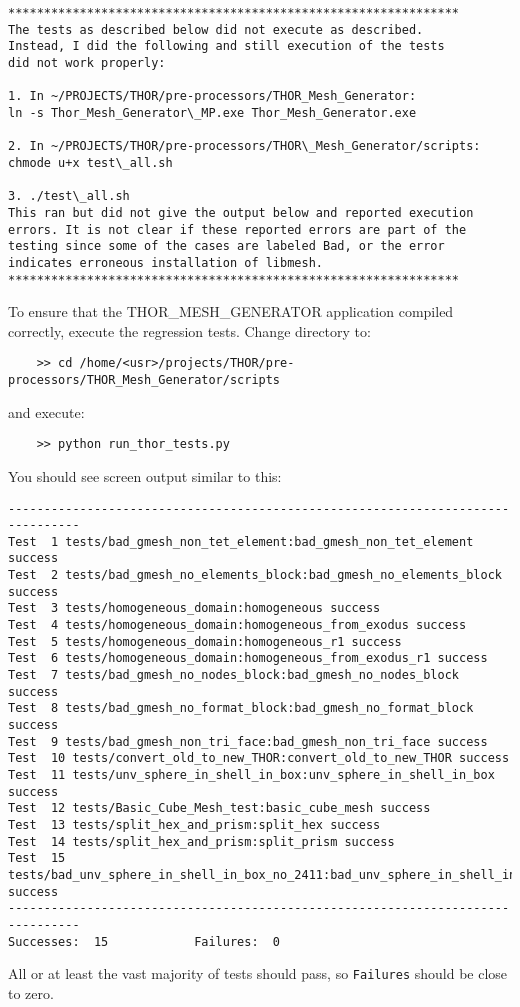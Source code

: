 \begin{verbatim}
***************************************************************
The tests as described below did not execute as described.
Instead, I did the following and still execution of the tests
did not work properly:

1. In ~/PROJECTS/THOR/pre-processors/THOR_Mesh_Generator:
ln -s Thor_Mesh_Generator\_MP.exe Thor_Mesh_Generator.exe

2. In ~/PROJECTS/THOR/pre-processors/THOR\_Mesh_Generator/scripts:
chmode u+x test\_all.sh

3. ./test\_all.sh
This ran but did not give the output below and reported execution
errors. It is not clear if these reported errors are part of the
testing since some of the cases are labeled Bad, or the error
indicates erroneous installation of libmesh.
***************************************************************
\end{verbatim}


To ensure that the THOR\_MESH\_GENERATOR application compiled correctly, execute the regression tests. Change directory to:
\begin{verbatim}
    >> cd /home/<usr>/projects/THOR/pre-processors/THOR_Mesh_Generator/scripts
\end{verbatim}
and execute:
\begin{verbatim}
    >> python run_thor_tests.py 
\end{verbatim}
You should see screen output similar to this:
\begin{verbatim}
--------------------------------------------------------------------------------
Test  1 tests/bad_gmesh_non_tet_element:bad_gmesh_non_tet_element success
Test  2 tests/bad_gmesh_no_elements_block:bad_gmesh_no_elements_block success
Test  3 tests/homogeneous_domain:homogeneous success
Test  4 tests/homogeneous_domain:homogeneous_from_exodus success
Test  5 tests/homogeneous_domain:homogeneous_r1 success
Test  6 tests/homogeneous_domain:homogeneous_from_exodus_r1 success
Test  7 tests/bad_gmesh_no_nodes_block:bad_gmesh_no_nodes_block success
Test  8 tests/bad_gmesh_no_format_block:bad_gmesh_no_format_block success
Test  9 tests/bad_gmesh_non_tri_face:bad_gmesh_non_tri_face success
Test  10 tests/convert_old_to_new_THOR:convert_old_to_new_THOR success
Test  11 tests/unv_sphere_in_shell_in_box:unv_sphere_in_shell_in_box success
Test  12 tests/Basic_Cube_Mesh_test:basic_cube_mesh success
Test  13 tests/split_hex_and_prism:split_hex success
Test  14 tests/split_hex_and_prism:split_prism success
Test  15 tests/bad_unv_sphere_in_shell_in_box_no_2411:bad_unv_sphere_in_shell_in_box_no_2411 success
--------------------------------------------------------------------------------
Successes:  15            Failures:  0
\end{verbatim}
All or at least the vast majority of tests should pass, so \verb"Failures" should be close to zero.